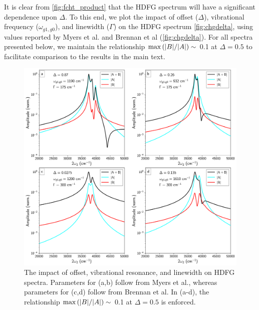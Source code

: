 \documentclass[aip, jcp, reprint, onecolumn, nofootinbib]{revtex4-2}
\begin{document}
It is clear from \autoref{fig:fcht_product} that the HDFG spectrum will have a significant dependence upon $\Delta$. 
To this end, we plot the impact of offset ($\Delta$), vibrational frequency ($\omega_{g1,g0}$), and linewidth ($\Gamma$) on the HDFG spectrum \autoref{fig:chgdelta}, using values reported by Myers et al. and Brennan et al (\autoref{fig:chgdelta}). \cite{Myers1982, Brennan2024}
For all spectra presented below, we maintain the relationship $\max \left(\abs{B}/\abs{A}\right) \sim$ 0.1 at $\Delta = 0.5$ to facilitate comparison to the results in the main text.
\pagebreak
\begin{figure}[!htbp]
	\centering
	\includegraphics[width=6.675in]{figures/changedelta.png}
	\caption{The impact of offset, vibrational resonance, and linewidth on HDFG spectra. Parameters for (a,b) follow from Myers et al.,\cite{Myers1982} whereas parameters for (c,d) follow from Brennan et al.\cite{Brennan2024}
	In (a-d), the relationship $\max \left(\abs{B}/\abs{A}\right) \sim$ 0.1 at $\Delta = 0.5$ is enforced.
} 
	\label{fig:chgdelta}
\end{figure}
\end{document}
